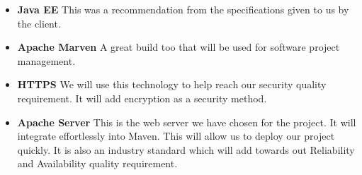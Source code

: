 \begin{itemize}
	\item \textbf{Java EE}
		This was a recommendation from the specifications given to us by the client.
	\item \textbf{Apache Marven}
		A great build too that will be used for software project management.
	\item \textbf{HTTPS}
		We will use this technology to help reach our security quality requirement. It will add encryption as a security method.
	\item \textbf{Apache Server}
		This is the web server we have chosen for the project. It will integrate effortlessly into Maven. This will allow us to deploy our project quickly. It is also an industry standard which will add towards out Reliability and Availability quality requirement. 
\end{itemize}